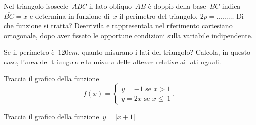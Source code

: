 % 
% 
% 

\begin{esercizio}
\label{ese:D.60}
Nel triangolo isoscele~${ABC}$ il lato obliquo~${AB}$ è doppio della base~${BC}$ 
indica~$\overline{BC}=x$ e determina in funzione
di~$x$ il perimetro del triangolo. $2p=\ldots \ldots \ldots$
Di che funzione si tratta? Descrivila e rappresentala nel riferimento cartesiano 
ortogonale, dopo aver fissato le opportune condizioni
sulla variabile indipendente.

Se il perimetro è~$120\unit{cm}$, quanto misurano i lati del triangolo?
Calcola, in questo caso, l'area del triangolo e la misura delle altezze relative 
ai lati uguali.
\end{esercizio}

\begin{esercizio}
\label{ese:D.61}
Traccia il grafico della funzione
\[f(x)=\left\{\begin{array}{l}
y=-1\text{ se } x>1\\
y=2x\text{ se } x \le~1\end{array}\right..\]
\end{esercizio}

\begin{esercizio}
\label{ese:D.62}
Traccia il grafico della funzione~$y=|{x+1}|$
\end{esercizio}

